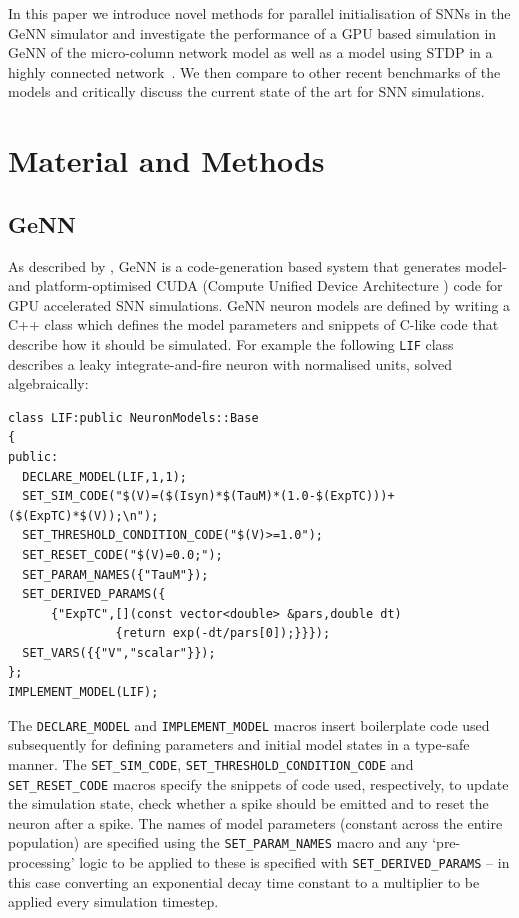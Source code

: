 \documentclass[utf8]{frontiersSCNS} %
\begin{document}
In this paper we introduce novel methods for parallel initialisation of SNNs in the GeNN simulator and investigate the performance of a GPU based simulation in GeNN of the micro-column network model \cite{Potjans2012,VanAlbada2018} as well as a model using STDP in a highly connected network~\citep{Morrison2007}.
We then compare to other recent benchmarks of the models \citep{VanAlbada2018} and critically discuss the current state of the art for SNN simulations.

\section{Material and Methods}
\label{sec:method}
\subsection{GeNN}
\label{sec:method/genn}
As described by \citet{Yavuz2016}, GeNN is a code-generation based system that generates model- and platform-optimised CUDA (Compute Unified Device Architecture ) code for GPU accelerated SNN simulations.
GeNN neuron models are defined by writing a C++ class which defines the model parameters and snippets of C-like code that describe how it should be simulated.
For example the following \lstinline{LIF} class describes a leaky integrate-and-fire neuron with normalised units, solved algebraically:
%
\begin{lstlisting}
class LIF:public NeuronModels::Base
{
public:
  DECLARE_MODEL(LIF,1,1);
  SET_SIM_CODE("$(V)=($(Isyn)*$(TauM)*(1.0-$(ExpTC)))+($(ExpTC)*$(V));\n");
  SET_THRESHOLD_CONDITION_CODE("$(V)>=1.0");
  SET_RESET_CODE("$(V)=0.0;");
  SET_PARAM_NAMES({"TauM"});
  SET_DERIVED_PARAMS({
      {"ExpTC",[](const vector<double> &pars,double dt)
               {return exp(-dt/pars[0]);}}});
  SET_VARS({{"V","scalar"}});
};
IMPLEMENT_MODEL(LIF);
\end{lstlisting}
%
The \lstinline{DECLARE_MODEL} and \lstinline{IMPLEMENT_MODEL} macros insert boilerplate code used subsequently for defining parameters and initial model states in a type-safe manner.
The \lstinline{SET_SIM_CODE}, \lstinline{SET_THRESHOLD_CONDITION_CODE} and \lstinline{SET_RESET_CODE} macros specify the snippets of code used, respectively, to update the simulation state, check whether a spike should be emitted and to reset the neuron after a spike.
The names of model parameters (constant across the entire population) are specified using the \lstinline{SET_PARAM_NAMES} macro and any `pre-processing' logic to be applied to these is specified with \lstinline{SET_DERIVED_PARAMS} -- in this case converting an exponential decay time constant to a multiplier to be applied every simulation timestep.
\end{document}
